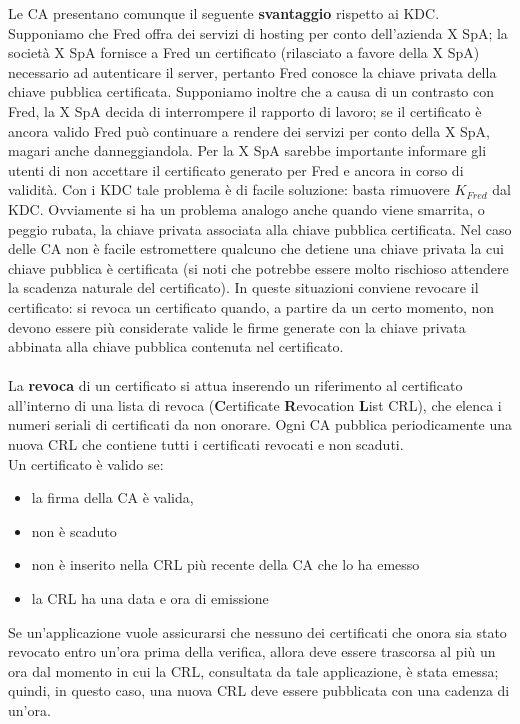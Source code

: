 Le CA presentano comunque il seguente \textbf{svantaggio} rispetto ai KDC. Supponiamo che Fred offra dei servizi di hosting per conto dell'azienda X SpA; la società X SpA fornisce a Fred un certificato (rilasciato a favore della X SpA) necessario ad autenticare il server, pertanto Fred conosce la chiave privata della chiave pubblica certificata. Supponiamo inoltre che a causa di un contrasto con Fred, la X SpA decida di interrompere il rapporto di lavoro; se il certificato è ancora valido Fred può continuare a rendere dei servizi per conto della X SpA, magari anche danneggiandola. Per la X SpA sarebbe importante informare gli utenti di non accettare il certificato generato per Fred e ancora in corso di validità. Con i KDC tale problema è di facile soluzione: basta rimuovere $K_{Fred}$ dal KDC. Ovviamente si ha un problema analogo anche quando viene smarrita, o peggio rubata, la chiave privata associata alla chiave pubblica certificata. Nel caso delle CA non è facile estromettere qualcuno che detiene una chiave privata la cui chiave pubblica è certificata (si noti che potrebbe essere molto rischioso attendere la scadenza naturale del certificato). In queste situazioni conviene revocare il certificato: si revoca un certificato quando, a partire da un certo momento, non devono essere più considerate valide le firme generate con la chiave privata abbinata alla chiave pubblica contenuta nel certificato. \\ \\
La \textbf{revoca} di un certificato si attua inserendo un riferimento al certificato all'interno di una lista di revoca (\textbf{C}ertificate \textbf{R}evocation \textbf{L}ist CRL), che elenca i numeri seriali di certificati da non onorare. Ogni CA pubblica periodicamente una nuova CRL che contiene tutti i certificati revocati e non scaduti.\\
Un certificato è valido se:
\begin{itemize}
	\item la firma della CA è valida,
	\item non è scaduto
	\item non è inserito nella CRL più recente della CA che lo ha emesso
	\item la CRL ha una data e ora di emissione
\end{itemize}
Se un'applicazione vuole assicurarsi che nessuno dei certificati che onora sia stato revocato entro un'ora prima della verifica, allora deve essere trascorsa al più un ora dal momento in cui la CRL, consultata da tale applicazione, è stata emessa; quindi, in questo caso, una nuova CRL deve essere pubblicata con una cadenza di un'ora.\\
